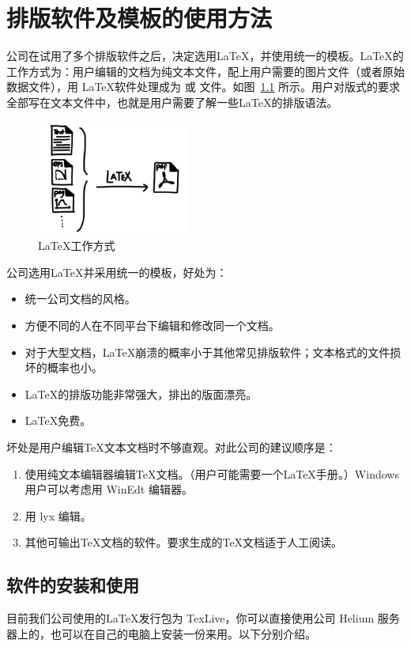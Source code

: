 \chapter{排版软件及模板的使用方法}
公司在试用了多个排版软件之后，决定选用\LaTeX ，并使用统一的模板。\LaTeX 的工作方式为：用户编辑的文档为纯文本文件，配上用户需要的图片文件（或者原始数据文件），用 \LaTeX 软件处理成为  或  文件。如图~\ref{latex} 所示。用户对版式的要求全部写在文本文件中，也就是用户需要了解一些\LaTeX 的排版语法。

\begin{figure}[htbp]\centering
\includegraphics[width=0.45\textwidth]{latex_wm.jpg} 
\caption{\label{latex}\LaTeX 工作方式}
\end{figure}

公司选用\LaTeX 并采用统一的模板，好处为：
\begin{itemize}
\item 统一公司文档的风格。
\item 方便不同的人在不同平台下编辑和修改同一个文档。
\item 对于大型文档，\LaTeX 崩溃的概率小于其他常见排版软件；文本格式的文件损坏的概率也小。
\item \LaTeX 的排版功能非常强大，排出的版面漂亮。
\item \LaTeX 免费。
\end{itemize}
坏处是用户编辑\TeX 文本文档时不够直观。对此公司的建议顺序是：
\begin{enumerate}
\item 使用纯文本编辑器编辑\TeX 文档。（用户可能需要一个\LaTeX 手册\cite{oetiker1995not}。）Windows 用户可以考虑用 WinEdt 编辑器。
\item 用 lyx 编辑。
\item 其他可输出\TeX 文档的软件。要求生成的\TeX 文档适于人工阅读。
\end{enumerate}

\section{软件的安装和使用}
目前我们公司使用的\LaTeX 发行包为 TexLive，你可以直接使用公司 Helium 服务器上的，也可以在自己的电脑上安装一份来用。以下分别介绍。

